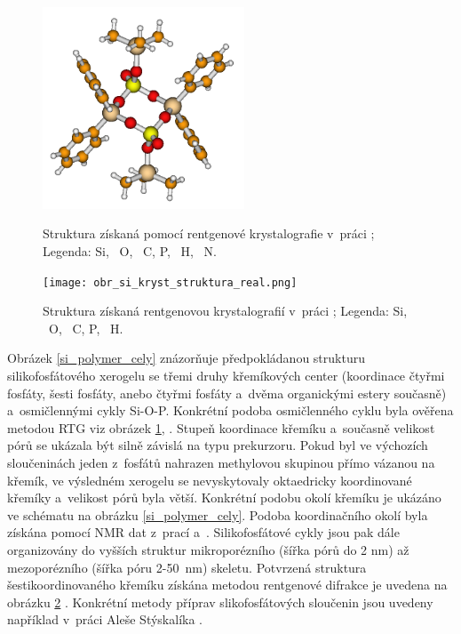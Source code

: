 \documentclass[
digital, %
table,   %
nolof,     %
nolot,     %
oneside,
]{fithesis3}
\begin{document}
\begin{figure}
\caption{Struktura \ce{[(Ph2Si{O2P(O)OSiMe3})2]} získaná pomocí rentgenové krystalografie v~práci \cite{rtg_4_pinkas}; Legenda:  Si, ~O, ~C,  P, ~H, ~N.}
\center \includegraphics[width=6cm]{rtg_kruh_samostatne.png} \label{rtg_cyklus} \end{figure}

\begin{figure}
\caption{Struktura získaná rentgenovou krystalografií v~práci \cite{C3NJ00721A};  Legenda:  Si, ~O, ~C,  P, ~H. }
\center \texttt{[image: obr\_si\_kryst\_struktura\_real.png]} \label{rtg_koordinace_sest} \end{figure}


Obrázek \ref{si_polymer_cely} znázorňuje předpokládanou strukturu silikofosfátového xerogelu se třemi druhy křemíkových center (koordinace čtyřmi fosfáty, šesti fosfáty, anebo čtyřmi fosfáty a~dvěma organickými estery současně) a~osmičlennými cykly Si-O-P.  Konkrétní podoba osmičlenného cyklu byla ověřena metodou RTG viz obrázek \ref{rtg_cyklus}, \cite{rtg_4_pinkas}. Stupeň koordinace křemíku a~současně velikost pórů se ukázala být silně závislá na typu prekurzoru. Pokud byl ve výchozích sloučeninách jeden z~fosfátů nahrazen methylovou skupinou přímo vázanou na křemík, ve výsledném xerogelu se nevyskytovaly oktaedricky koordinované křemíky a~velikost pórů byla větší. Konkrétní podobu okolí křemíku je ukázáno ve schématu na obrázku \ref{si_polymer_cely}. Podoba koordinačního okolí byla získána pomocí NMR dat z~prací \cite{rtg_4_pinkas} a~\cite{Styskalik2015thesis}. Silikofosfátové cykly jsou pak dále organizovány do vyšších struktur mikroporézního (šířka pórů do 2 nm) až mezoporézního (šířka póru 2-50~nm) skeletu. Potvrzená struktura šestikoordinovaného křemíku získána metodou rentgenové difrakce je uvedena na obrázku \ref{rtg_koordinace_sest} \cite{C3NJ00721A}. Konkrétní metody příprav slikofosfátových sloučenin jsou uvedeny například v~práci Aleše Stýskalíka \cite{Styskalik2015thesis}.
\end{document}
